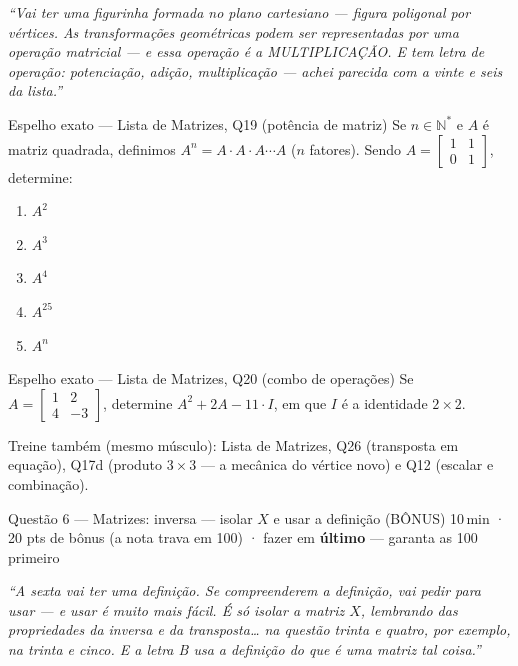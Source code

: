 \documentclass[11pt]{article}
\newcommand{\meta}[1]{{\small\color{inkgray}#1}}
\begin{document}
\begin{profquote}
\small\itshape ``Vai ter uma figurinha formada no plano cartesiano — figura poligonal por vértices. As transformações geométricas podem ser representadas por uma operação matricial — e essa operação é a MULTIPLICAÇÃO. E tem letra de operação: potenciação, adição, multiplicação — achei parecida com a vinte e seis da lista.''
\end{profquote}

\begin{espelhobox}{Espelho exato — Lista de Matrizes, Q19 (potência de matriz)}
Se $n\in\mathbb{N}^{*}$ e $A$ é matriz quadrada, definimos $A^{n}=A\cdot A\cdot A \cdots A$ ($n$ fatores).
Sendo $A=\begin{bmatrix} 1 & 1 \\ 0 & 1 \end{bmatrix}$, determine:
\begin{enumerate}[label=\alph*), itemsep=0pt, leftmargin=2em]
  \item $A^{2}$
  \item $A^{3}$
  \item $A^{4}$
  \item $A^{25}$
  \item $A^{n}$
\end{enumerate}
\end{espelhobox}

\begin{espelhobox}{Espelho exato — Lista de Matrizes, Q20 (combo de operações)}
Se $A=\begin{bmatrix} 1 & 2 \\ 4 & -3 \end{bmatrix}$, determine $A^{2}+2A-11\cdot I$, em que $I$ é a identidade $2\times 2$.
\end{espelhobox}

\meta{Treine também (mesmo músculo): Lista de Matrizes, Q26 (transposta em equação), Q17d (produto $3\times3$ — a mecânica do vértice novo) e Q12 (escalar e combinação).}

\begin{questaobox}{Questão 6 — Matrizes: inversa — isolar $X$ e usar a definição (BÔNUS)}
\meta{10\,min · 20 pts de bônus (a nota trava em 100) · fazer em \textbf{último} — garanta as 100 primeiro}
\end{questaobox}

\begin{profquote}
\small\itshape ``A sexta vai ter uma definição. Se compreenderem a definição, vai pedir para usar — e usar é muito mais fácil. É só isolar a matriz $X$, lembrando das propriedades da inversa e da transposta\ldots{} na questão trinta e quatro, por exemplo, na trinta e cinco. E a letra B usa a definição do que é uma matriz tal coisa.''
\end{profquote}
\end{document}
